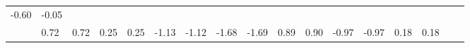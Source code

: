 \documentclass[
]{book}
\begin{document}
\begin{longtable}[]{@{}lllllllllllllllll@{}}
\begin{minipage}[t]{0.04\columnwidth}
-0.60\strut
\end{minipage} & \begin{minipage}[t]{0.03\columnwidth}\raggedright
-0.05\strut
\end{minipage}\tabularnewline
\begin{minipage}[t]{0.03\columnwidth}\raggedright
\strut
\end{minipage} & \begin{minipage}[t]{0.04\columnwidth}\raggedright
0.72\strut
\end{minipage} & \begin{minipage}[t]{0.03\columnwidth}\raggedright
0.72\strut
\end{minipage} & \begin{minipage}[t]{0.04\columnwidth}\raggedright
0.25\strut
\end{minipage} & \begin{minipage}[t]{0.03\columnwidth}\raggedright
0.25\strut
\end{minipage} & \begin{minipage}[t]{0.05\columnwidth}\raggedright
-1.13\strut
\end{minipage} & \begin{minipage}[t]{0.03\columnwidth}\raggedright
-1.12\strut
\end{minipage} & \begin{minipage}[t]{0.03\columnwidth}\raggedright
-1.68\strut
\end{minipage} & \begin{minipage}[t]{0.03\columnwidth}\raggedright
-1.69\strut
\end{minipage} & \begin{minipage}[t]{0.05\columnwidth}\raggedright
0.89\strut
\end{minipage} & \begin{minipage}[t]{0.03\columnwidth}\raggedright
0.90\strut
\end{minipage} & \begin{minipage}[t]{0.03\columnwidth}\raggedright
-0.97\strut
\end{minipage} & \begin{minipage}[t]{0.03\columnwidth}\raggedright
-0.97\strut
\end{minipage} & \begin{minipage}[t]{0.04\columnwidth}\raggedright
0.18\strut
\end{minipage} & \begin{minipage}[t]{0.03\columnwidth}\raggedright
0.18\strut
\end{minipage} & \begin{minipage}[t]{0.04\columnwidth}\raggedright

\end{minipage}
\end{longtable}
\end{document}
